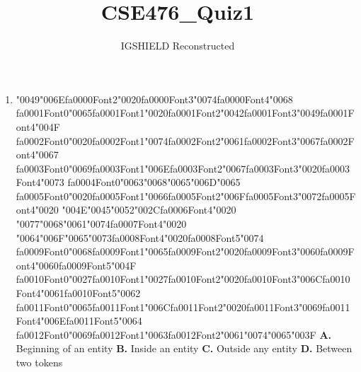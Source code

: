 \documentclass[11pt]{article}
\title{CSE476\_Quiz1}
\author{IGSHIELD Reconstructed}
\date{}
\begin{document}
\maketitle
\begin{enumerate}[leftmargin=*]
  \item {\char"0049}{\char"006E}{\csname fa0000Font2\endcsname\char"0020}{\csname fa0000Font3\endcsname\char"0074}{\csname fa0000Font4\endcsname\char"0068} {\csname fa0001Font0\endcsname\char"0065}{\csname fa0001Font1\endcsname\char"0020}{\csname fa0001Font2\endcsname\char"0042}{\csname fa0001Font3\endcsname\char"0049}{\csname fa0001Font4\endcsname\char"004F} {\csname fa0002Font0\endcsname\char"0020}{\csname fa0002Font1\endcsname\char"0074}{\csname fa0002Font2\endcsname\char"0061}{\csname fa0002Font3\endcsname\char"0067}{\csname fa0002Font4\endcsname\char"0067} {\csname fa0003Font0\endcsname\char"0069}{\csname fa0003Font1\endcsname\char"006E}{\csname fa0003Font2\endcsname\char"0067}{\csname fa0003Font3\endcsname\char"0020}{\csname fa0003Font4\endcsname\char"0073} {\csname fa0004Font0\endcsname\char"0063}{\char"0068}{\char"0065}{\char"006D}{\char"0065} {\csname fa0005Font0\endcsname\char"0020}{\csname fa0005Font1\endcsname\char"0066}{\csname fa0005Font2\endcsname\char"006F}{\csname fa0005Font3\endcsname\char"0072}{\csname fa0005Font4\endcsname\char"0020} {\char"004E}{\char"0045}{\char"0052}{\char"002C}{\csname fa0006Font4\endcsname\char"0020} {\char"0077}{\char"0068}{\char"0061}{\char"0074}{\csname fa0007Font4\endcsname\char"0020} {\char"0064}{\char"006F}{\char"0065}{\char"0073}{\csname fa0008Font4\endcsname\char"0020}{\csname fa0008Font5\endcsname\char"0074} {\csname fa0009Font0\endcsname\char"0068}{\csname fa0009Font1\endcsname\char"0065}{\csname fa0009Font2\endcsname\char"0020}{\csname fa0009Font3\endcsname\char"0060}{\csname fa0009Font4\endcsname\char"0060}{\csname fa0009Font5\endcsname\char"004F} {\csname fa0010Font0\endcsname\char"0027}{\csname fa0010Font1\endcsname\char"0027}{\csname fa0010Font2\endcsname\char"0020}{\csname fa0010Font3\endcsname\char"006C}{\csname fa0010Font4\endcsname\char"0061}{\csname fa0010Font5\endcsname\char"0062} {\csname fa0011Font0\endcsname\char"0065}{\csname fa0011Font1\endcsname\char"006C}{\csname fa0011Font2\endcsname\char"0020}{\csname fa0011Font3\endcsname\char"0069}{\csname fa0011Font4\endcsname\char"006E}{\csname fa0011Font5\endcsname\char"0064} {\csname fa0012Font0\endcsname\char"0069}{\csname fa0012Font1\endcsname\char"0063}{\csname fa0012Font2\endcsname\char"0061}{\char"0074}{\char"0065}{\char"003F}
    \textbf{A.} Beginning of an entity
    \textbf{B.} Inside an entity
    \textbf{C.} Outside any entity
    \textbf{D.} Between two tokens


\end{enumerate}
\end{document}
